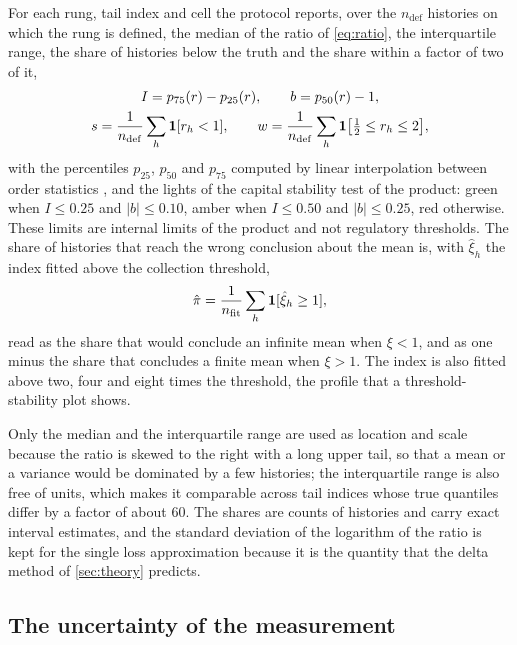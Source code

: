 For each rung, tail index and cell the protocol reports, over the $n_{\mathrm{def}}$ histories on which the rung is defined, the median of the ratio of \cref{eq:ratio}, the interquartile range, the share of histories below the truth and the share within a factor of two of it,
\begin{equation}
\begin{gathered}
I=p_{75}(r)-p_{25}(r),\qquad b=p_{50}(r)-1,\\
s=\frac{1}{n_{\mathrm{def}}}\sum_h\mathbf{1}[r_h<1],\qquad w=\frac{1}{n_{\mathrm{def}}}\sum_h\mathbf{1}\bigl[\tfrac12\le r_h\le2\bigr],
\end{gathered}
\label{eq:metrics}
\end{equation}
with the percentiles $p_{25}$, $p_{50}$ and $p_{75}$ computed by linear interpolation between order statistics \citep{hyndman1996}, and the lights of the capital stability test of the product: green when $I\le0.25$ and $|b|\le0.10$, amber when $I\le0.50$ and $|b|\le0.25$, red otherwise. These limits are internal limits of the product and not regulatory thresholds.
The share of histories that reach the wrong conclusion about the mean is, with $\hat\xi_h$ the index fitted above the collection threshold,
\begin{equation}
\hat\pi=\frac{1}{n_{\mathrm{fit}}}\sum_h\mathbf{1}[\hat\xi_h\ge1],
\label{eq:pi}
\end{equation}
read as the share that would conclude an infinite mean when $\xi<1$, and as one minus the share that concludes a finite mean when $\xi>1$. The index is also fitted above two, four and eight times the threshold, the profile that a threshold-stability plot shows.

Only the median and the interquartile range are used as location and scale because the ratio is skewed to the right with a long upper tail, so that a mean or a variance would be dominated by a few histories; the interquartile range is also free of units, which makes it comparable across tail indices whose true quantiles differ by a factor of about 60. The shares are counts of histories and carry exact interval estimates, and the standard deviation of the logarithm of the ratio is kept for the single loss approximation because it is the quantity that the delta method of \cref{sec:theory} predicts.

\subsection{The uncertainty of the measurement}
\label{sec:pm-uncertainty}

